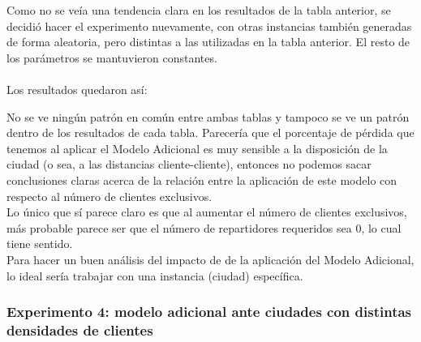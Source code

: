 \documentclass{article}
\begin{document}
    Como no se veía una tendencia clara en los resultados de la tabla anterior, se decidió hacer el experimento nuevamente, con otras instancias también generadas de forma aleatoria, pero distintas a las utilizadas en la tabla anterior. El resto de los parámetros se mantuvieron constantes. \\
    \\
    Los resultados quedaron así:
    
    \begin{table}[H]
    \centering
    \caption{Comparación de costos entre Nuevo Modelo y Modelo Adicional para diferentes cantidades de clientes exclusivos, versión II}
    \end{table}
    
    No se ve ningún patrón en común entre ambas tablas y tampoco se ve un patrón dentro de los resultados de cada tabla. Parecería que el porcentaje de pérdida que tenemos al aplicar el Modelo Adicional es muy sensible a la disposición de la ciudad (o sea, a las distancias cliente-cliente), entonces no podemos sacar conclusiones claras acerca de la relación entre la aplicación de este modelo con respecto al número de clientes exclusivos. \\
    Lo único que sí parece claro es que al aumentar el número de clientes exclusivos, más probable parece ser que el número de repartidores requeridos sea 0, lo cual tiene sentido. \\
    Para hacer un buen análisis del impacto de de la aplicación del Modelo Adicional, lo ideal sería trabajar con una instancia (ciudad) específica.
    
    \subsubsection{Experimento 4: modelo adicional ante ciudades con distintas densidades de clientes}
    
\end{document}
